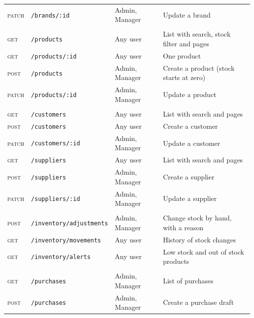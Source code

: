 \documentclass[11pt,a4paper]{article}
\newcommand{\code}[1]{\texttt{#1}}
\begin{document}
\begin{longtable}{@{}P{1.45cm}P{5.1cm}P{2.5cm}P{5.25cm}@{}}
\textsc{patch} & \code{/\allowbreak{}brands/\allowbreak{}:id} & Admin, Manager & Update a brand \\
\addlinespace
{} \\
\textsc{get} & \code{/\allowbreak{}products} & Any user & List with search, stock filter and pages \\
\textsc{get} & \code{/\allowbreak{}products/\allowbreak{}:id} & Any user & One product \\
\textsc{post} & \code{/\allowbreak{}products} & Admin, Manager & Create a product (stock starts at zero) \\
\textsc{patch} & \code{/\allowbreak{}products/\allowbreak{}:id} & Admin, Manager & Update a product \\
\addlinespace
{} \\
\textsc{get} & \code{/\allowbreak{}customers} & Any user & List with search and pages \\
\textsc{post} & \code{/\allowbreak{}customers} & Any user & Create a customer \\
\textsc{patch} & \code{/\allowbreak{}customers/\allowbreak{}:id} & Admin, Manager & Update a customer \\
\textsc{get} & \code{/\allowbreak{}suppliers} & Any user & List with search and pages \\
\textsc{post} & \code{/\allowbreak{}suppliers} & Admin, Manager & Create a supplier \\
\textsc{patch} & \code{/\allowbreak{}suppliers/\allowbreak{}:id} & Admin, Manager & Update a supplier \\
\addlinespace
{} \\
\textsc{post} & \code{/\allowbreak{}inventory/\allowbreak{}adjustments} & Admin, Manager & Change stock by hand, with a reason \\
\textsc{get} & \code{/\allowbreak{}inventory/\allowbreak{}movements} & Any user & History of stock changes \\
\textsc{get} & \code{/\allowbreak{}inventory/\allowbreak{}alerts} & Any user & Low stock and out of stock products \\
\addlinespace
{} \\
\textsc{get} & \code{/\allowbreak{}purchases} & Admin, Manager & List of purchases \\
\textsc{post} & \code{/\allowbreak{}purchases} & Admin, Manager & Create a purchase draft \\

\end{longtable}
\end{document}
